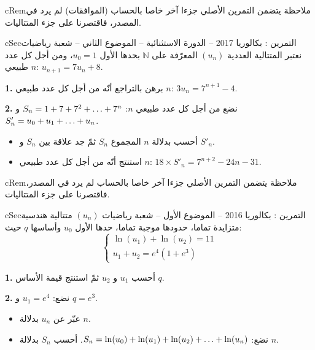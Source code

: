 \documentclass[12pt,a4paper]{article}
\newenvironment{BOX}[2]{\begin{otherlanguage}{english}\begin{arbox}{#1}{#2}}{\end{arbox}\end{otherlanguage}}
\newenvironment{molahada}[1][ملاحظة]{\begin{BOX}{cRem}{#1}}{\end{BOX}}
\newcounter{exo}
\newenvironment{tamrin}[1]{\stepcounter{exo}\begin{BOX}{cSec}{التمرين \theexo: #1}}{\end{BOX}}
\renewcommand{\dots}{\mathinner{\ldotp\ldotp\ldotp}}
\newcommand{\N}{\mathbb{N}}
\newenvironment{sq}{\begin{itemize}[leftmargin=2.4em,itemsep=3pt]}{\end{itemize}}
\newcommand{\qa}{\item[(أ)]}\newcommand{\qb}{\item[(ب)]}\newcommand{\qc}{\item[(جـ)]}\newcommand{\qd}{\item[(د)]}\newcommand{\qe}{\item[(هـ)]}
\newcommand{\QQ}[1]{\par\smallskip\textbf{#1.} }
\begin{document}
\begin{molahada}
يتضمن التمرين الأصلي جزءا آخر خاصا بالحساب (الموافقات) لم يرد في المصدر، فاقتصرنا على جزء المتتاليات.
\end{molahada}

\begin{tamrin}{بكالوريا 2017 -- الدورة الاستثنائية -- الموضوع الثاني -- شعبة رياضيات}
نعتبر المتتالية العددية $(u_n)$ المعرّفة على $\N$ بحدها الأول $u_0=1$، ومن أجل كل عدد طبيعي $n$: $u_{n+1}=7u_n+8$.
\QQ{1} برهن بالتراجع أنّه من أجل كل عدد طبيعي $n$: $3u_n=7^{n+1}-4$.
\QQ{2} نضع من أجل كل عدد طبيعي $n$: $S_n=1+7+7^2+\dots+7^n$ و $S'_n=u_0+u_1+\dots+u_n$.
\begin{sq}
\qa أحسب بدلالة $n$ المجموع $S_n$ ثمّ جد علاقة بين $S_n$ و $S'_n$.
\qb استنتج أنّه من أجل كل عدد طبيعي $n$: $18\times S'_n=7^{n+2}-24n-31$.
\end{sq}
\end{tamrin}

\begin{molahada}
يتضمن التمرين الأصلي جزءا آخر خاصا بالحساب لم يرد في المصدر، فاقتصرنا على جزء المتتاليات.
\end{molahada}

\begin{tamrin}{بكالوريا 2016 -- الموضوع الأول -- شعبة رياضيات}
$(u_n)$ متتالية هندسية متزايدة تماما، حدودها موجبة تماما، حدها الأول $u_0$ وأساسها $q$ حيث:
\[\begin{cases}\ln(u_1)+\ln(u_2)=11\\ u_1+u_2=e^4\left(1+e^3\right)\end{cases}\]
\QQ{1} أحسب $u_1$ و $u_2$ ثمّ استنتج قيمة الأساس $q$.
\QQ{2} نضع: $u_1=e^4$ و $q=e^3$.
\begin{sq}
\qa عبّر عن $u_n$ بدلالة $n$.
\qb نضع: $S_n=\ln(u_0)+\ln(u_1)+\ln(u_2)+\dots+\ln(u_n)$. أحسب $S_n$ بدلالة $n$.
\end{sq}
\end{tamrin}
\end{document}

